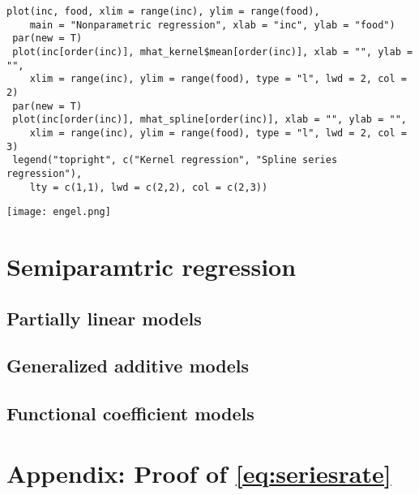 \documentclass[11pt, A4paper, openany, uplatex]{book}
\begin{document}
\begin{lstlisting}[basicstyle=\ttfamily\footnotesize, frame=single]
 plot(inc, food, xlim = range(inc), ylim = range(food), 
	main = "Nonparametric regression", xlab = "inc", ylab = "food")
 par(new = T)
 plot(inc[order(inc)], mhat_kernel$mean[order(inc)], xlab = "", ylab = "",
	xlim = range(inc), ylim = range(food), type = "l", lwd = 2, col = 2)
 par(new = T)
 plot(inc[order(inc)], mhat_spline[order(inc)], xlab = "", ylab = "",
	xlim = range(inc), ylim = range(food), type = "l", lwd = 2, col = 3)
 legend("topright", c("Kernel regression", "Spline series regression"), 
	lty = c(1,1), lwd = c(2,2), col = c(2,3))
\end{lstlisting}

\begin{center}
	\texttt{[image: engel.png]}
\end{center}

\section{Semiparamtric regression}

\subsection{Partially linear models}

\subsection{Generalized additive models}

\subsection{Functional coefficient models}

\section*{Appendix: Proof of \eqref{eq:seriesrate}}
\end{document}
